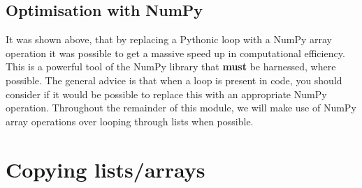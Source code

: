 \documentclass[a4paper]{article}
\begin{document}
\subsection{Optimisation with NumPy}

It was shown above, that by replacing a Pythonic loop with a NumPy array operation it was possible to get a massive speed up in computational efficiency.
This is a powerful tool of the NumPy library that \textbf{must} be harnessed, where possible.
The general advice is that when a loop is present in code, you should consider if it would be possible to replace this with an appropriate NumPy operation.
Throughout the remainder of this module, we will make use of NumPy array operations over looping through lists when possible.
\vspace{\baselineskip}
\begin{center}
	\noindent{}
\end{center}

\section{Copying lists/arrays}
\end{document}
